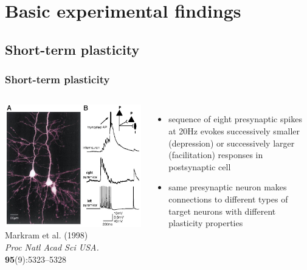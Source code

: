 \documentclass{beamer}
\begin{document}

\section{Basic experimental findings}

\subsection{Short-term plasticity}

\begin{frame}
  \frametitle{Short-term plasticity}

\begin{columns}
\includegraphics[width=\textwidth]{./figures/std_exp2}
\vspace*{3mm}
\tiny{Markram et al. (1998)\\
\textit{Proc Natl Acad Sci USA.} \textbf{95}(9):5323--5328}
\begin{itemize}
\item sequence of eight presynaptic spikes at 20Hz evokes successively smaller (depression) or successively larger (facilitation) responses in postsynaptic cell
\item same presynaptic neuron makes connections to different types of target neurons with different plasticity properties
\end{itemize}


\end{columns}
\end{frame}
\end{document}
